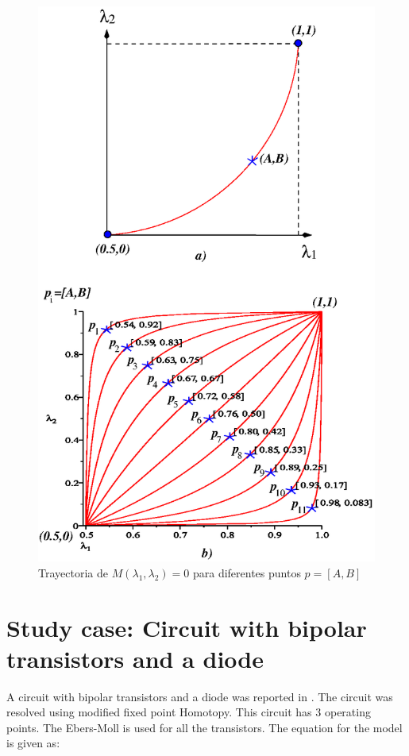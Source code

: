 \documentclass[conference,letterpaper,twocolumn]{IEEEtran}
\begin{document}
\begin{figure}[hbtp]
\centering
\includegraphics[scale=0.6]{fig/curvasl.eps}
\caption{Trayectoria  de $M(\lambda_1,\lambda_2)=0$ para diferentes puntos $p=[A,B]$}
\label{curvasl}
\end{figure}



\section{Study case: Circuit with bipolar transistors and a diode}


A circuit with bipolar transistors and a diode was reported in \cite{homo_yamamura}. The circuit was resolved using modified fixed point Homotopy. This circuit has 3 operating points. The Ebers-Moll is used for all the transistors. The equation for the model is given as:
\end{document}
